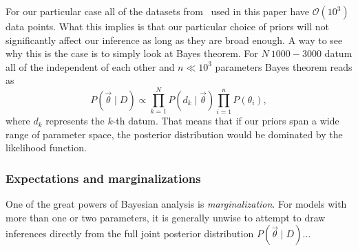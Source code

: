 For our particular case all of the datasets from~\cite{Jones2014} used in this
paper have $\mathcal{O}(10^3)$ data points. What this implies is that our
particular choice of priors will not significantly affect our inference as long
as they are broad enough. A way to see why this is the case is to simply look at
Bayes theorem. For $N ~ 1000-3000$ datum all of the independent of each other
and $n \ll 10^3$ parameters Bayes theorem reads as
\begin{equation}
P(\vec{\theta} \mid D) \propto \prod_{k=1}^{N} P(d_k \mid \vec{\theta})
\prod_{i=1}^n P(\theta_i),
\end{equation}
where $d_k$ represents the $k$-th datum. That means that if our priors span a
wide range of parameter space, the posterior distribution would be dominated by
the likelihood function.

\subsubsection{Expectations and marginalizations}
One of the great powers of Bayesian analysis is \textit{marginalization}.
For models with more than one or two parameters, it is generally unwise
to attempt to draw inferences directly from the full joint posterior
distribution $P(\vec{\theta} \mid D)$...


